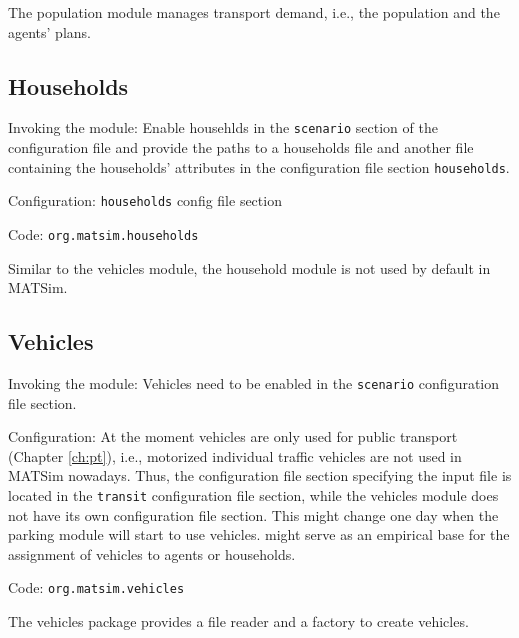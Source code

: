 The population module manages transport demand, i.e., the population and the agents' plans.
\subsection{Households}
\label{sec:households}
\begin{compactitem}
\item Invoking the module: Enable househlds in the \lstinline|scenario| section of the configuration file and provide the paths to a households file and another file containing the households' attributes in the configuration file section \lstinline|households|.
\item Configuration: \lstinline|households| config file section
\item Code: \lstinline|org.matsim.households|
\end{compactitem}

Similar to the vehicles module, the household module is not used by default in MATSim.

\subsection{Vehicles}
\label{sec:vehicles}
\begin{compactitem}
\item Invoking the module: Vehicles need to be enabled in the \lstinline|scenario| configuration file section.
\item Configuration: At the moment vehicles are only used for public transport (Chapter \ref{ch:pt}), i.e., motorized individual traffic vehicles are not used in MATSim nowadays. Thus, the configuration file section specifying the input file is located in the \lstinline|transit| configuration file section, while the vehicles module does not have its own configuration file section.  This might change one day when the parking module will start to use vehicles. \citet[][]{JaeggiEtAl_TRR_2012} might serve as an empirical base for the assignment of vehicles to agents or households.
\item Code: \lstinline|org.matsim.vehicles|
\end{compactitem}

The vehicles package provides a file reader and a factory to create vehicles.

